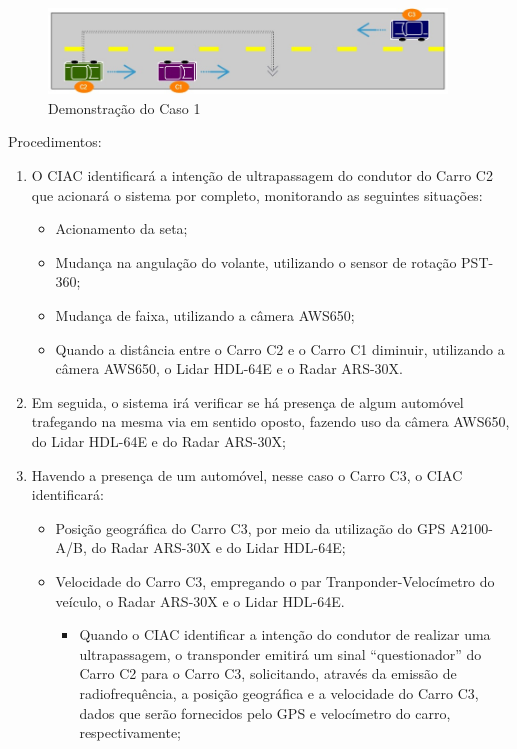 \begin{figure}[h]
  \centering
  \includegraphics[width=400px, scale=1]{figuras/caso1}
  \caption{Demonstração do Caso 1}
\label{fig:caso1}
\end{figure}

Procedimentos:

\begin{enumerate}
  \item O CIAC identificará a intenção de ultrapassagem do condutor do Carro
  C2 que acionará o sistema por completo, monitorando as seguintes situações:
  \begin{itemize}
    \item Acionamento da seta;
    \item Mudança na angulação do volante, utilizando o sensor de rotação PST-360;
    \item Mudança de faixa, utilizando a câmera AWS650;
    \item Quando a distância entre o Carro C2 e o Carro C1 diminuir, utilizando a
    câmera AWS650, o Lidar HDL-64E e o Radar ARS-30X.
  \end{itemize}

  \item Em seguida, o sistema irá verificar se há presença de algum automóvel
  trafegando na mesma via em sentido oposto, fazendo uso da câmera AWS650, do
  Lidar HDL-64E e do Radar ARS-30X;

  \item Havendo a presença de um automóvel, nesse caso o Carro C3, o CIAC identificará:
  \begin{itemize}
    \item Posição geográfica do Carro C3, por meio da utilização do GPS
    A2100-A/B, do Radar ARS-30X e do Lidar HDL-64E;

    \item Velocidade do Carro C3, empregando o par Tranponder-Velocímetro do
    veículo, o Radar ARS-30X e o Lidar HDL-64E.
    \begin{itemize}
      \item Quando o CIAC identificar a intenção do condutor de realizar uma
      ultrapassagem, o transponder emitirá um sinal “questionador” do Carro C2
      para o Carro C3, solicitando, através da emissão de radiofrequência, a
      posição geográfica e a velocidade do Carro C3, dados que serão fornecidos
      pelo GPS e velocímetro do carro, respectivamente;


\end{itemize}
\end{itemize}
\end{enumerate}
